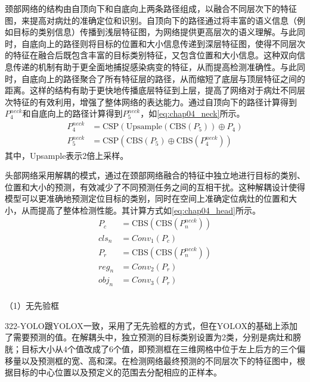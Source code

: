 颈部网络的结构由自顶向下和自底向上两条路径组成，以融合不同层次下的特征图，来提高对病灶的准确定位和识别。自顶向下的路径通过将丰富的语义信息（例如目标的类别信息）传播到浅层特征图，为网络提供更高层次的语义理解。与此同时，自底向上的路径则将目标的位置和大小信息传递到深层特征图，使得不同层次的特征在融合后既包含丰富的目标类别特征，又包含位置和大小信息。这种双向信息传递的机制有助于更全面地捕捉感染病变的特征，从而提高检测准确性。与此同时，自底向上的路径聚合了所有特征层的路径，从而缩短了底层与顶层特征之间的距离。这样的结构有助于更快地传播底层特征到上层，提高了网络对于病灶不同层次特征的有效利用，增强了整体网络的表达能力。通过自顶向下的路径计算得到\(P_4^{neck}\)和自底向上的路径计算得到\(P_5^{neck}\)，如\ref{eq:chap04_neck}所示。
\begin{equation}
  \begin{aligned}
    P_4^{neck} & = \text{CSP}(\text{Upsample}(\text{CBS}(P_5)) \oplus P_4)    \\
    P_5^{neck} & =  \text{CSP}(\text{CBS}(P_5) \oplus \text{CBS}(P_4^{neck}))
  \end{aligned}
  \label{eq:chap04_neck}
\end{equation}
其中，Upsample表示2倍上采样。

头部网络采用解耦的模式，通过在颈部网络融合的特征中独立地进行目标的类别、位置和大小的预测，有效减少了不同预测任务之间的互相干扰。这种解耦设计使得模型可以更准确地预测定位目标的类别，同时在空间上准确定位病灶的位置和大小，从而提高了整体检测性能。其计算方式如\ref{eq:chap04_head}所示。
\begin{equation}
  \begin{aligned}
    P_c   & = \text{CBS}(\text{CBS}(P_n^{neck})) \\
    cls_n & = Conv_1(P_c)                        \\
    P_r   & = \text{CBS}(\text{CBS}(P_n^{neck})) \\
    reg_n & = Conv_2(P_r)                        \\
    obj_n & = Conv_3(P_r)                        \\
  \end{aligned}
  \label{eq:chap04_head}
\end{equation}



（1）无先验框

322-YOLO跟YOLOX一致，采用了无先验框的方式，但在YOLOX的基础上添加了需要预测的值。在解耦头中，独立预测的目标类别设置为2类，分别是病灶和膀胱；目标大小从4个值改成了6个值，即预测框在三维网格中位于左上后方的三个偏移量以及预测框的宽、高和深。在检测网络最终预测的不同层次下的特征图中，根据目标的中心位置以及预定义的范围去分配相应的正样本。

